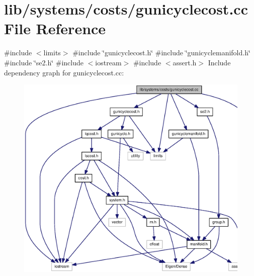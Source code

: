 \section{lib/systems/costs/gunicyclecost.cc \-File \-Reference}
\label{gunicyclecost_8cc}
{\ttfamily \#include $<$limits$>$}\*
{\ttfamily \#include \char`\"{}gunicyclecost.\-h\char`\"{}}\*
{\ttfamily \#include \char`\"{}gunicyclemanifold.\-h\char`\"{}}\*
{\ttfamily \#include \char`\"{}se2.\-h\char`\"{}}\*
{\ttfamily \#include $<$iostream$>$}\*
{\ttfamily \#include $<$assert.\-h$>$}\*
\-Include dependency graph for gunicyclecost.\-cc\-:\nopagebreak
\begin{figure}[H]
\begin{center}
\leavevmode
\includegraphics[width=350pt]{gunicyclecost_8cc__incl}
\end{center}
\end{figure}
